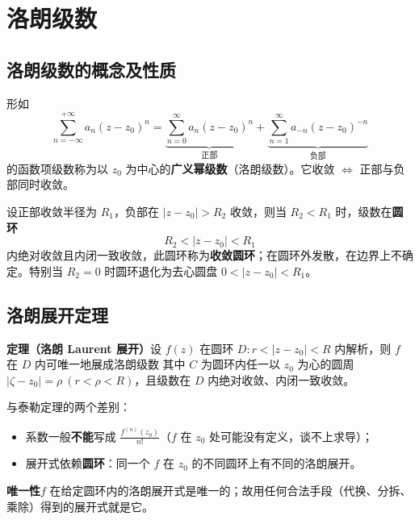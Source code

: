 \section{洛朗级数}

\subsection{洛朗级数的概念及性质}
形如
\[
\sum_{n=-\infty}^{+\infty}a_{n}(z-z_{0})^{n}
=\underbrace{\sum_{n=0}^{\infty}a_{n}(z-z_{0})^{n}}_{\text{正部}}
+\underbrace{\sum_{n=1}^{\infty}a_{-n}(z-z_{0})^{-n}}_{\text{负部}}
\]
的函数项级数称为以 \(z_{0}\) 为中心的\textbf{广义幂级数}（洛朗级数）。它收敛 \(\iff\) 正部与负部同时收敛。

设正部收敛半径为 \(R_{1}\)，负部在 \(|z-z_{0}|>R_{2}\) 收敛，则当 \(R_{2}<R_{1}\) 时，级数在\textbf{圆环}
\[
R_{2}<|z-z_{0}|<R_{1}
\]
内绝对收敛且内闭一致收敛，此圆环称为\textbf{收敛圆环}；在圆环外发散，在边界上不确定。特别当 \(R_{2}=0\) 时圆环退化为去心圆盘 \(0<|z-z_{0}|<R_{1}\)。

\subsection{洛朗展开定理}
\textbf{定理（洛朗 Laurent 展开）}\quad 设 \(f(z)\) 在圆环 \(D:r<|z-z_{0}|<R\) 内解析，则 \(f\) 在 \(D\) 内可唯一地展成洛朗级数
其中 \(C\) 为圆环内任一以 \(z_{0}\) 为心的圆周 \(|\zeta-z_{0}|=\rho\ (r<\rho<R)\)，且级数在 \(D\) 内绝对收敛、内闭一致收敛。

与泰勒定理的两个差别：
\begin{itemize}[leftmargin=2em]
  \item 系数一般\textbf{不能}写成 \(\frac{f^{(n)}(z_{0})}{n!}\)（\(f\) 在 \(z_{0}\) 处可能没有定义，谈不上求导）；
  \item 展开式依赖\textbf{圆环}：同一个 \(f\) 在 \(z_{0}\) 的不同圆环上有不同的洛朗展开。
\end{itemize}

\textbf{唯一性}\quad \(f\) 在给定圆环内的洛朗展开式是唯一的；故用任何合法手段（代换、分拆、乘除）得到的展开式就是它。

